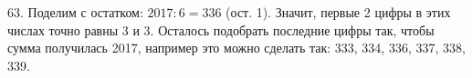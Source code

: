 63. Поделим с остатком: $2017:6=336$ (ост. 1). Значит, первые 2 цифры в этих числах точно равны 3 и 3. Осталось подобрать последние цифры так, чтобы сумма получилась 2017, например это можно сделать так: 333, 334, 336, 337, 338, 339.\\
